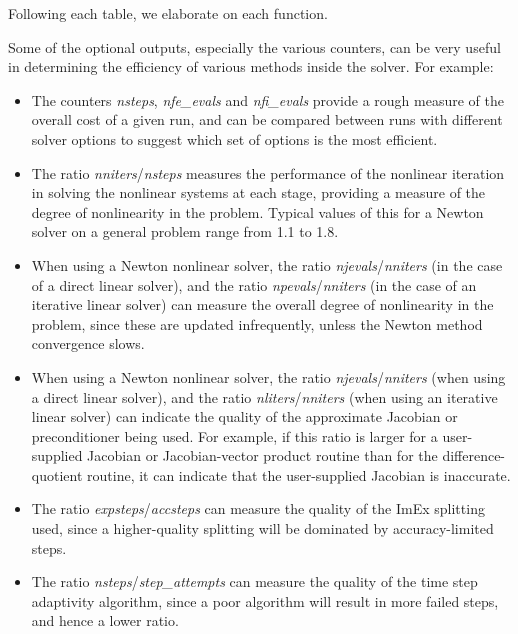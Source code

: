 \documentclass[letterpaper,10pt,english]{sphinxmanual}
\begin{document}
Following each table, we elaborate on each function.

Some of the optional outputs, especially the various counters, can be
very useful in determining the efficiency of various methods inside
the {\hyperref[c_interface/User_callable:ARKode]{}} solver.  For example:
\begin{itemize}
\item {} 
The counters \emph{nsteps}, \emph{nfe\_evals} and \emph{nfi\_evals} provide a rough
measure of the overall cost of a given run, and can be compared
between runs with different solver options to suggest which set of
options is the most efficient.

\item {} 
The ratio \emph{nniters}/\emph{nsteps} measures the performance of the
nonlinear iteration in solving the nonlinear systems at each stage,
providing a measure of the degree of nonlinearity in the problem.
Typical values of this for a Newton solver on a general problem
range from 1.1 to 1.8.

\item {} 
When using a Newton nonlinear solver, the ratio \emph{njevals}/\emph{nniters}
(in the case of a direct linear solver), and the ratio
\emph{npevals}/\emph{nniters} (in the case of an iterative linear solver)
can measure the overall degree of nonlinearity in the problem,
since these are updated infrequently, unless the Newton method
convergence slows.

\item {} 
When using a Newton nonlinear solver, the ratio \emph{njevals}/\emph{nniters}
(when using a direct linear solver), and the ratio
\emph{nliters}/\emph{nniters} (when using an iterative linear solver) can
indicate the quality of the approximate Jacobian or preconditioner being
used.  For example, if this ratio is larger for a user-supplied
Jacobian or Jacobian-vector product routine than for the
difference-quotient routine, it can indicate that the user-supplied
Jacobian is inaccurate.

\item {} 
The ratio \emph{expsteps}/\emph{accsteps} can measure the quality of the ImEx
splitting used, since a higher-quality splitting will be dominated
by accuracy-limited steps.

\item {} 
The ratio \emph{nsteps}/\emph{step\_attempts} can measure the quality of the
time step adaptivity algorithm, since a poor algorithm will result
in more failed steps, and hence a lower ratio.

\end{itemize}
\end{document}
